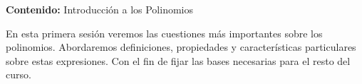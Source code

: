 {\Large \textbf{Contenido:} Introducción a los Polinomios}

En esta primera sesión veremos las cuestiones más importantes sobre los polinomios.
Abordaremos definiciones, propiedades y características particulares sobre estas expresiones.
Con el fin de fijar las bases necesarias para el resto del curso.